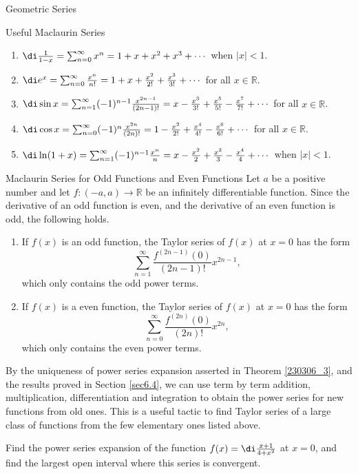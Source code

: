 \begin{example}[label=230305_16]{Geometric Series}
\begin{example}[label=230304_9]{}
\begin{example}{}
\begin{highlight}{Useful Maclaurin Series}
\begin{enumerate}[1.]
\item $\di \frac{1}{1-x}=\sum_{n=0}^{\infty}x^n=1+x+x^2+x^3+\cdots$ when $|x|<1$.
\item $\di e^x=\sum_{n=0}^{\infty}\frac{x^n}{n!}=1+x+\frac{x^2}{2!}+\frac{x^3}{3!}+\cdots$ for all $x\in\mathbb{R}$.
\item $\di \sin x=\sum_{n=1}^{\infty}(-1)^{n-1}\frac{x^{2n-1}}{(2n-1)!}=x-\frac{x^3}{3!}+\frac{x^5}{5!}-\frac{x^7}{7!}+\cdots$ for all $x\in\mathbb{R}$.
\item $\di \cos x= \sum_{n=0}^{\infty}(-1)^n\frac{x^{2n }}{(2n)!}=1-\frac{x^2}{2!}+\frac{x^4}{4!}-\frac{x^6}{6!} +\cdots$ for all $x\in\mathbb{R}$.
\item $\di \ln(1+x)=\sum_{n=1}^{\infty}(-1)^{n-1}\frac{x^n}{n}=x-\frac{x^2}{2}+\frac{x^3}{3}-\frac{x^4}{4}+\cdots$ when $|x|<1$.
\end{enumerate}
\end{highlight}

\begin{remark}{Maclaurin Series for Odd Functions and Even Functions}
Let $a$ be a positive number and let $f:(-a,a)\to\mathbb{R}$ be an infinitely differentiable function. Since the derivative of an odd function is even, and the derivative of an even function is odd, the following holds.
\begin{enumerate}[1.]
\item If $f(x)$ is an odd function, the Taylor series of $f(x)$ at $x=0$ has the form
\[\sum_{n=1}^{\infty}\frac{f^{(2n-1)}(0)}{(2n-1)!}x^{2n-1},\]which only contains the odd power terms. 
\item If $f(x)$ is a even function,   the Taylor series of $f(x)$ at $x=0$ has the form
\[\sum_{n=0}^{\infty}\frac{f^{(2n)}(0)}{(2n)!}x^{2n},\]which only contains the even power terms.
\end{enumerate}
\end{remark}

By the uniqueness of power series expansion asserted in Theorem \ref{230306_3}, and the results proved in Section \ref{sec6.4}, we can use term by term addition, multiplication, differentiation and integration   to obtain the power series for new functions from old ones. This is a useful tactic to find Taylor series of a large class of functions from the few elementary ones listed above.

\begin{example}{}
Find the power series expansion of the function $f(x)=\di\frac{x+1}{4+x^2}$ at $x=0$, and find the largest open interval where this series is convergent.


\end{example}
\end{example}
\end{example}
\end{example}
